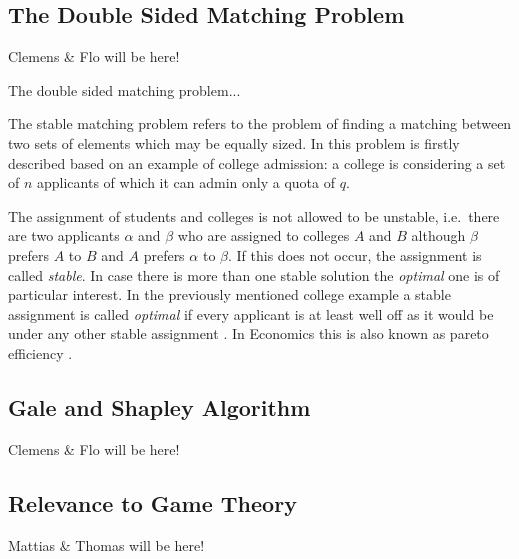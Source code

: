 \subsection{The Double Sided Matching Problem}
Clemens \& Flo will be here!

The double sided matching problem...

The stable matching problem refers to the problem of finding a matching between two sets of elements which may be equally sized. In \cite[p. 9]{gale62a} this problem is firstly described based on an example of college admission: a college is considering a set of $n$ applicants of which it can admin only a quota of $q$.

The assignment of students and colleges is not allowed to be unstable, i.e.\ there are two applicants $\alpha$ and $\beta$ who are assigned to colleges $A$ and $B$ although $\beta$ prefers $A$ to $B$ and $A$ prefers $\alpha$ to $\beta$. If this does not occur, the assignment is called \textit{stable}. In case there is more than one stable solution the \textit{optimal} one is of particular interest. In the previously mentioned college example a stable assignment is called \textit{optimal} if every applicant is at least well off as it would be under any other stable assignment \cite[p. 10]{gale62a}. In Economics this is also known as pareto efficiency \cite[p. 46]{9780199297818}.

\subsection{Gale and Shapley Algorithm}
Clemens \& Flo will be here!

\subsection{Relevance to Game Theory}
Mattias \& Thomas will be here!